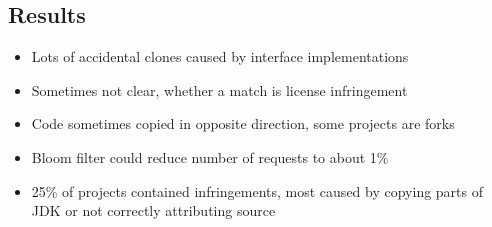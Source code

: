 \subsection{Results}
\begin{frame}{\insertsubsection}
	\begin{itemize}
		\item Lots of accidental clones caused by interface implementations
		\item Sometimes not clear, whether a match is license infringement
		\item Code sometimes copied in opposite direction, some projects are forks
	\end{itemize}

	\begin{itemize}
		\item Bloom filter could reduce number of requests to about 1\%
		\item 25\% of projects contained infringements, most caused by copying parts of JDK or not correctly attributing source
	\end{itemize}

\end{frame}